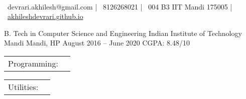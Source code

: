\documentclass[]{awesome-cv}
\begin{document}
    
\begin{center}
	  \\
	\vspace{2mm}
	{\faEnvelope\ devrari.akhilesh@gmail.com} | {\faMobile\ 8126268021} | {\faMapMarker\ 004 B3 IIT Mandi 175005} | {\faLink\ \href{https://akhileshdevrari.github.io/}{akhileshdevrari.github.io}}
\end{center}

\vspace{1mm}
\begin{cventries}
	\cventry
	{B. Tech in Computer Science and Engineering}
	{Indian Institute of Technology Mandi}
	{Mandi, HP}
	{August 2016 – June 2020}
	{CGPA: 8.48/10}
\end{cventries}


\begin{cventries}
	\vspace{-4mm}
	\cventry
	{}
	{\def\arraystretch{1.15}{\begin{tabular}{ l l }
		Programming:  & {\skill{ Comfortable: C/C++, Javascript \hspace{1cm} Less experience: PHP, Python}} \\
		\end{tabular}}}
	{}
	{}
	{}
	
	\vspace{-10mm}
	\cventry
	{}
	{\def\arraystretch{1.15}{\begin{tabular}{ l l }
			Utilities:  & {\skill{ MySQL, Git, Linux shell utilities, HTML/CSS}} \\
		\end{tabular}}}
	{}
	{}
	{}
\end{cventries}
\end{document}
